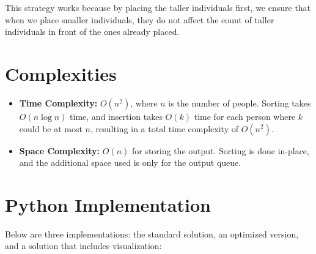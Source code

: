 This strategy works because by placing the taller individuals first, we ensure that when we place smaller individuals, they do not affect the count of taller individuals in front of the ones already placed.


\section*{Complexities}

\begin{itemize}
	\item \textbf{Time Complexity:} \( O(n^2) \), where \( n \) is the number of people. Sorting takes \( O(n\log n) \) time, and insertion takes \( O(k) \) time for each person where \( k \) could be at most \( n \), resulting in a total time complexity of \( O(n^2) \).
	\item \textbf{Space Complexity:} \( O(n) \) for storing the output. Sorting is done in-place, and the additional space used is only for the output queue.
\end{itemize}

\newpage %
\section*{Python Implementation}


Below are three implementations: the standard solution, an optimized version, and a solution that includes visualization:

